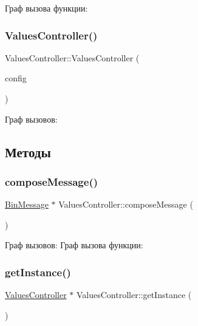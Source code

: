 Граф вызова функции\+:
\mbox{\label{class_values_controller_a9d8f277bbf71b14581286225e81d4c93}} 
\subsubsection{\texorpdfstring{Values\+Controller()}{ValuesController()}\hspace{0.1cm}{\footnotesize\ttfamily [2/2]}}
{\footnotesize\ttfamily Values\+Controller\+::\+Values\+Controller (\begin{DoxyParamCaption}\item[{\hyperlink{class_imitator_config}{Imitator\+Config} $\ast$}]{config }\end{DoxyParamCaption})}

Граф вызовов\+:


\subsection{Методы}
\mbox{\label{class_values_controller_a3ff8d09321924df6d04310463d0660c6}} 
\subsubsection{\texorpdfstring{compose\+Message()}{composeMessage()}}
{\footnotesize\ttfamily \hyperlink{class_bin_message}{Bin\+Message} $\ast$ Values\+Controller\+::compose\+Message (\begin{DoxyParamCaption}{ }\end{DoxyParamCaption})}

Граф вызовов\+:
Граф вызова функции\+:
\mbox{\label{class_values_controller_a2b7b09d37db8c1cf82d35024254b5628}} 
\subsubsection{\texorpdfstring{get\+Instance()}{getInstance()}}
{\footnotesize\ttfamily \hyperlink{class_values_controller}{Values\+Controller} $\ast$ Values\+Controller\+::get\+Instance (\begin{DoxyParamCaption}{ }\end{DoxyParamCaption})\hspace{0.3cm}{\ttfamily [static]}}

